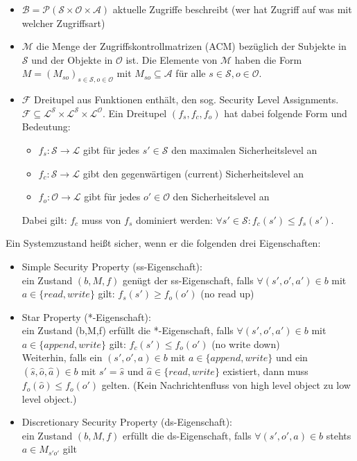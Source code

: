 \documentclass[a4paper,twoside,DIV15,BCOR12mm]{scrbook}
\begin{document}
\begin{itemize}
	\item $\mathcal{B} = \mathcal{P}(\mathcal{S} \times \mathcal{O} \times \mathcal{A})$ aktuelle Zugriffe beschreibt (wer hat Zugriff auf was mit welcher Zugriffsart)
	\item $\mathcal{M}$ die Menge der Zugriffskontrollmatrizen (ACM) bezüglich der Subjekte in $\mathcal{S}$ und der Objekte in $\mathcal{O}$ ist. Die Elemente von $\mathcal{M}$ haben die Form $M = (M_{so})_{s \in \mathcal{S}, o \in \mathcal{O}}$ mit $M_{so} \subseteq \mathcal{A}$ für alle $s \in \mathcal{S}, o \in \mathcal{O}$.
	\item $\mathcal{F}$ Dreitupel aus Funktionen enthält, den sog. Security Level Assignments. $\mathcal{F} \subseteq \mathcal{L}^\mathcal{S} \times \mathcal{L}^\mathcal{S} \times \mathcal{L}^\mathcal{O}$. Ein Dreitupel $(f_s, f_c, f_o)$ hat dabei folgende Form und Bedeutung:
		\begin{itemize}
			\item $f_s \colon \mathcal{S} \rightarrow \mathcal{L}$ gibt für jedes $s' \in \mathcal{S}$ den maximalen Sicherheitslevel an
			\item $f_c \colon \mathcal{S} \rightarrow \mathcal{L}$ gibt den gegenwärtigen (current) Sicherheitslevel an
			\item $f_o \colon \mathcal{O} \rightarrow \mathcal{L}$ gibt für jedes $o' \in \mathcal{O}$ den Sicherheitslevel an
		\end{itemize}
		Dabei gilt: $f_c$ muss von $f_s$ dominiert werden: $\forall s' \in \mathcal{S} \colon f_c(s') \leq f_s(s')$.
\end{itemize}

Ein Systemzustand heißt sicher, wenn er die folgenden drei Eigenschaften:

\begin{itemize}
	\item Simple Security Property (ss-Eigenschaft):\\ ein Zustand $(b,M,f)$ genügt der ss-Eigenschaft, falls $\forall (s',o',a') \in b$ mit $a \in \{read, write\}$ gilt: $f_s(s') \geq f_o(o')$ (\glqq no read up\grqq)
	\item Star Property (*-Eigenschaft):\\ ein Zustand (b,M,f) erfüllt die *-Eigenschaft, falls $\forall (s',o',a') \in b$ mit $a \in \{append, write\}$ gilt: $f_c(s') \leq f_o(o')$ (\glqq no write down\grqq)\\ Weiterhin, falls ein $(s', o',a) \in b$ mit $a \in \{append, write\}$ und ein $(\hat s, \hat o, \hat a) \in b$ mit $s' = \hat s$ und $\hat a \in \{read, write\}$ existiert, dann muss $f_o(\hat o) \leq f_o(o')$ gelten. (\glqq Kein Nachrichtenfluss von high level object zu low level object.\grqq)
	\item Discretionary Security Property (ds-Eigenschaft):\\ ein Zustand $(b,M,f)$ erfüllt die ds-Eigenschaft, falls $\forall (s',o',a) \in b$ stehts $a \in M_{s'o'}$ gilt
\end{itemize}
\end{document}
